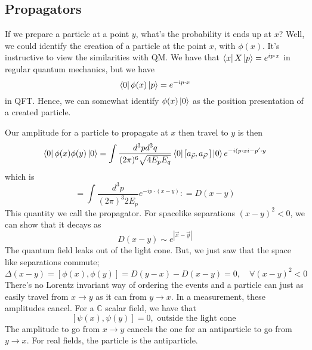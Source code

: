 \subsection{Propagators} 

If we prepare a particle at a point $ y $, what's the probability it 
ends up at $ x $? Well, we could identify the creation 
of a particle at the point $ x $, with  $ \phi ( x) $. It's instructive to view the similarities with QM. 
We have that  $ \bra { x } X \ket { p }  = e^{i p \cdot  x} $ in regular quantum mechanics, but we have
\[
\bra{ 0 } \phi ( x) \ket { p }  = e^{  - i p \cdot  x }
\] in QFT. Hence, we can somewhat identify $ \phi ( x) \ket{ 0 } $ as the position  presentation of a created particle. 

Our amplitude for a particle to propagate at $x $ then travel to $ y $ is then  
\[
\bra{0}\phi ( x) \phi( y ) \ket{0}  = \int \frac{d^ 3 p d^ 3 q }{ ( 2 \pi )^6 \sqrt{ 4 E_p E_q } } \bra{0}[ a_{\vec{p}}, a_{\vec{p}'}]\ket{0} e^{  - i (  p \cdot  x   i -  p' \cdot  y }
\] which is 
\[
= \int \frac{d^3 p }{ ( 2 \pi )^ 3 2E_p } e^{  - i p \cdot  ( x - y ) } : = D ( x - y ) 
\] This quantity we call the propagator. 
For spacelike separations $ ( x - y )^2 < 0 $, we can show that it decays as 
\[
D( x -y ) \sim e^{ | \vec{x} - \vec{y} |  } 
\] The quantum field leaks out of the light cone. 
But, we just saw that the space like separations commute; 
\[
\Delta ( x -y ) = [ \phi( x ), \phi ( y) ] = D( y - x ) - D ( x- y )  =0 ,\quad \forall ( x - y )^2 < 0 
\] There's no Lorentz invariant way of ordering the events and a particle can just as 
easily travel from $ x \to  y $ as it can from $ y \to x $. 
In a measurement, these amplitudes cancel. 
For a $ \mathbb{ C} $ scalar field, we have that 
\[
[ \psi ( x), \psi ( y ) ] = 0, \text{ outside the light cone } 
\] 
The amplitude to go from $ x \to  y $ cancels the one 
for an antiparticle to go from 
$ y \to   x$. For real fields, the particle is the antiparticle. 

